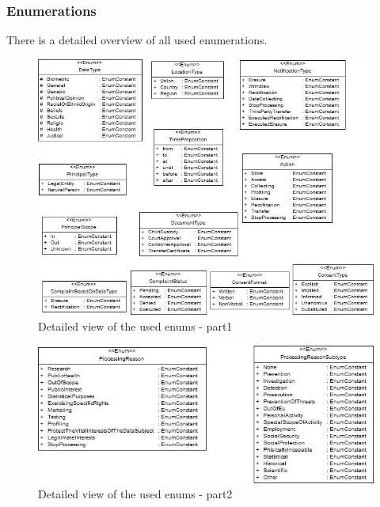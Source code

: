 \documentclass[11pt,english]{article}
\begin{document}
\subsubsection{Enumerations}
There is a detailed overview of all used enumerations.
\begin{figure}[H]
    \centering
    \includegraphics[width=12.5cm]{images/enums1.jpg}
    \caption{Detailed view of the used enums - part1}
    \label{fig:Enums1}
\end{figure}
\begin{figure}[H]
    \centering
    \includegraphics[width=12.5cm]{images/enums2.jpg}
    \caption{Detailed view of the used enums - part2}
    \label{fig:Enums2}
\end{figure}
\end{document}
